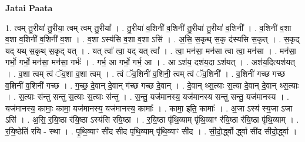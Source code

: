 \documentclass[17pt]{extarticle}
\begin{document}
\textbf{Jatai Paata} \newline

1. त्वम् तु॒रीया॑ तु॒रीया॒ त्वम् त्वम् तु॒रीया᳚ । . तु॒रीया॑ व॒शिनी॑ व॒शिनी॑ तु॒रीया॑ तु॒रीया॑ व॒शिनी᳚ । . व॒शिनी॑ व॒शा व॒शा व॒शिनी॑ व॒शिनी॑ व॒शा । . व॒शा ऽस्य॑सि व॒शा व॒शा ऽसि॑ । . अ॒सि॒ स॒कृथ् स॒कृ द॑स्यसि स॒कृत् । . स॒कृद् यद् यथ् स॒कृथ् स॒कृद् यत् । . यत् त्वा᳚ त्वा॒ यद् यत् त्वा᳚ । . त्वा॒ मन॑सा॒ मन॑सा त्वा त्वा॒ मन॑सा । . मन॑सा॒ गर्भो॒ गर्भो॒ मन॑सा॒ मन॑सा॒ गर्भः॑ । . गर्भ॒ आ गर्भो॒ गर्भ॒ आ । . आ ऽश॑य॒ दश॑य॒दा ऽश॑यत् । . अश॑य॒दित्यश॑यत् । . व॒शा त्वम् त्वं ॅव॒शा व॒शा त्वम् । . त्वं ॅव॒शिनी॑ व॒शिनी॒ त्वम् त्वं ॅव॒शिनी᳚ । . व॒शिनी॑ गच्छ गच्छ व॒शिनी॑ व॒शिनी॑ गच्छ । . ग॒च्छ॒ दे॒वान् दे॒वान् ग॑च्छ गच्छ दे॒वान् । . दे॒वान् थ्स॒त्याः स॒त्या दे॒वान् दे॒वान् थ्स॒त्याः । . स॒त्याः स॑न्तु सन्तु स॒त्याः स॒त्याः स॑न्तु । . स॒न्तु॒ यज॑मानस्य॒ यज॑मानस्य सन्तु सन्तु॒ यज॑मानस्य । . यज॑मानस्य॒ कामाः॒ कामा॒ यज॑मानस्य॒ यज॑मानस्य॒ कामाः᳚ । . कामा॒ इति॒ कामाः᳚ । . अ॒जा ऽस्य॑ स्य॒जा ऽजा ऽसि॑ । . अ॒सि॒ र॒यि॒ष्ठा र॑यि॒ष्ठा ऽस्य॑सि रयि॒ष्ठा । . र॒यि॒ष्ठा पृ॑थि॒व्याम् पृ॑थि॒व्याꣳ र॑यि॒ष्ठा र॑यि॒ष्ठा पृ॑थि॒व्याम् । . र॒यि॒ष्ठेति॑ रयि - स्था । . पृ॒थि॒व्याꣳ सी॑द सीद पृथि॒व्याम् पृ॑थि॒व्याꣳ सी॑द । . सी॒दो॒र्द्ध्वो र्द्ध्वा सी॑द सीदो॒र्द्ध्वा । \newline
\end{document}

